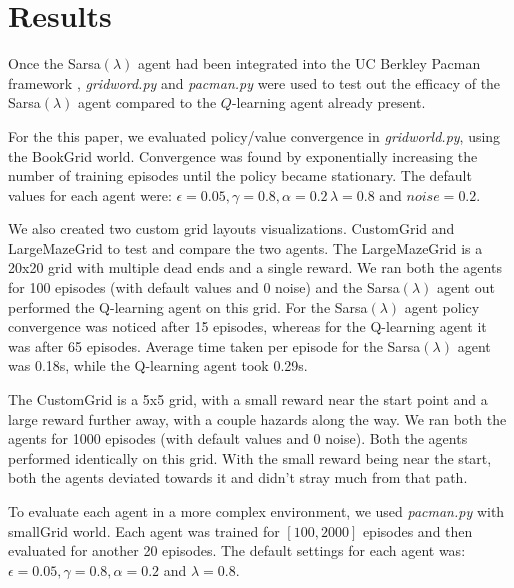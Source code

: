 \documentclass[10pt,conference]{IEEEtran}
\begin{document}
\section{Results}
\label{sec:results}
	
	Once the Sarsa\((\lambda)\) agent had been integrated into
	the UC Berkley Pacman framework \cite{ucbai}, \textit{gridword.py} and 
	\textit{pacman.py} were used to test out the efficacy of the Sarsa\((\lambda)\)
	agent compared to the \(Q\)-learning agent already present.  
	
	For the this paper, we evaluated policy/value convergence in \textit{gridworld.py}, using
	the BookGrid world.  Convergence was found by exponentially increasing the
	number of training episodes until the policy became stationary.  The default
	values for each agent were: \(\epsilon = 0.05, \gamma = 0.8, \alpha = 0.2\,
	\lambda = 0.8\) and \(noise = 0.2\).

	We also created two custom grid layouts visualizations. CustomGrid and LargeMazeGrid to test and compare the two agents. The LargeMazeGrid is a 20x20 grid with multiple dead ends and a single reward. We ran both the agents for 100 episodes (with default values and 0 noise) and the Sarsa\((\lambda)\) agent out performed the Q-learning agent on this grid. For the Sarsa\((\lambda)\) agent policy convergence was noticed after 15 episodes, whereas for the Q-learning agent it was after 65 episodes. Average time taken per episode for the Sarsa\((\lambda)\) agent was 0.18s, while the Q-learning agent took 0.29s.

	The CustomGrid is a 5x5 grid, with a small reward near the start point and a large reward further away, with a couple hazards along the way. We ran both the agents for 1000 episodes (with default values and 0 noise). Both the agents performed identically on this grid. With the small reward being near the start, both the agents deviated towards it and didn't stray much from that path. 
	
	To evaluate each agent in a more complex environment, we used 
	\textit{pacman.py} with smallGrid world. Each agent was trained for 
	\([100,2000]\) episodes and then evaluated for another 20 episodes.  The 
	default settings for each agent was: \(\epsilon = 0.05, \gamma = 0.8, 
	\alpha = 0.2\) and \(\lambda = 0.8\).
	
\end{document}
